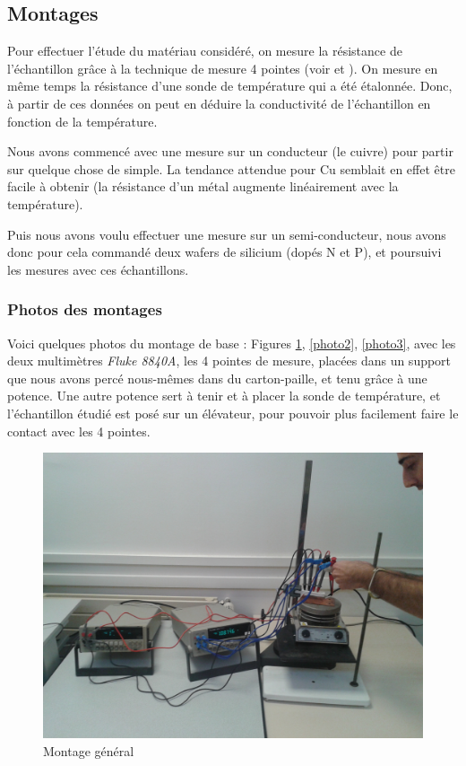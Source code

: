 \subsection{Montages}
Pour effectuer l'étude du matériau considéré, on mesure la résistance de l'échantillon grâce à la technique de mesure 4 pointes (voir \cite{philipsgloeilampenfabrieken_method_1958} et \cite{smits_measurement_1958}).
On mesure en même temps la résistance d'une sonde de température qui a été étalonnée.
Donc, à partir de ces données on peut en déduire la conductivité de l'échantillon en fonction de la température.

Nous avons commencé avec une mesure sur un conducteur (le cuivre) pour partir sur quelque chose de simple.
La tendance attendue pour Cu semblait en effet être facile à obtenir (la résistance d'un métal augmente linéairement avec la température).

Puis nous avons voulu effectuer une mesure sur un semi-conducteur, nous avons donc pour cela commandé deux wafers 
de silicium (dopés N et P), et poursuivi les mesures avec ces échantillons.

\subsubsection{Photos des montages}

Voici quelques photos du montage de base : Figures \ref{photo1}, \ref{photo2}, \ref{photo3}, avec les deux 
multimètres \emph{Fluke 8840A}, les 4 pointes de mesure, placées dans un support que nous avons percé 
nous-mêmes dans du carton-paille, et tenu grâce à une potence. Une autre potence sert à tenir et à placer la sonde de température, et l'échantillon étudié est posé sur un élévateur, pour pouvoir plus facilement faire le contact avec les 4 pointes.

\begin{figure}[hb]
  \begin{center}
		\includegraphics[width=12cm]{./images/photo1.jpg}
		\caption{Montage général}
		\label{photo1}
	\end{center}
\end{figure}


